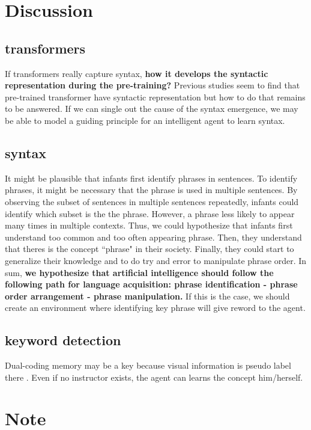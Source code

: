 \documentclass[12pt]{article}
\begin{document}
\section{Discussion}
\subsection{transformers}
If transformers really capture syntax, \textbf{how it develops the syntactic representation during the pre-training? }
Previous studies seem to find that pre-trained transformer have syntactic representation but how to do that remains 
to be answered. If we can single out the cause of the syntax emergence, we may be able to model a guiding principle 
for an intelligent agent to learn syntax.

\subsection{syntax}
It might be plausible that infants first identify phrases in sentences. To identify phrases, it might be necessary 
that the phrase is used in multiple sentences. By observing the subset of sentences in multiple sentences repeatedly, 
infants could identify which subset is the the phrase. However, a phrase less likely to appear many times in multiple contexts. 
Thus, we could hypothesize that infants first understand too common and too often appearing phrase. Then, they 
understand that theres is the concept ``phrase" in their society. Finally, they could start to generalize their knowledge 
and to do try and error to manipulate phrase order. In sum,\textbf{ we hypothesize that artificial intelligence should 
follow the following path for language acquisition: phrase identification - phrase order arrangement - phrase manipulation. }
If this is the case, we should create an environment where identifying key phrase will give reword to the agent. 

\subsection{keyword detection}
Dual-coding memory may be a key because visual information is pseudo label there \cite{Hill21}.
Even if no instructor exists, the agent can learns the concept him/herself.　


\section{Note}



\end{document}
